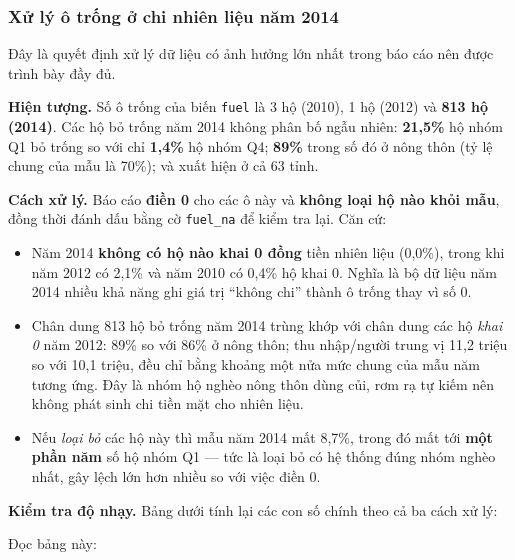 \documentclass[11pt,a4paper]{article}
\newcommand{\n}[1]{\textbf{#1}}
\newcommand{\tblfit}[1]{\resizebox{\linewidth}{!}{}}
\begin{document}
\subsubsection{Xử lý ô trống ở chi nhiên liệu năm 2014}\label{sec:fuel}

Đây là quyết định xử lý dữ liệu có ảnh hưởng lớn nhất trong báo cáo nên được trình bày đầy đủ.

\textbf{Hiện tượng.} Số ô trống của biến \texttt{fuel} là 3 hộ (2010), 1 hộ (2012) và \n{813 hộ (2014)}. Các hộ bỏ trống năm 2014 không phân bố ngẫu nhiên: \n{21,5\%} hộ nhóm Q1 bỏ trống so với chỉ \n{1,4\%} hộ nhóm Q4; \n{89\%} trong số đó ở nông thôn (tỷ lệ chung của mẫu là 70\%); và xuất hiện ở cả 63 tỉnh.

\textbf{Cách xử lý.} Báo cáo \n{điền 0} cho các ô này và \n{không loại hộ nào khỏi mẫu}, đồng thời đánh dấu bằng cờ \texttt{fuel\_na} để kiểm tra lại. Căn cứ:

\begin{itemize}[leftmargin=1.2em,itemsep=2pt,topsep=2pt]
\item Năm 2014 \n{không có hộ nào khai 0 đồng} tiền nhiên liệu (0,0\%), trong khi năm 2012 có 2,1\% và năm 2010 có 0,4\% hộ khai 0. Nghĩa là bộ dữ liệu năm 2014 nhiều khả năng ghi giá trị “không chi” thành ô trống thay vì số 0.
\item Chân dung 813 hộ bỏ trống năm 2014 trùng khớp với chân dung các hộ \emph{khai 0} năm 2012: 89\% so với 86\% ở nông thôn; thu nhập/người trung vị 11,2 triệu so với 10,1 triệu, đều chỉ bằng khoảng một nửa mức chung của mẫu năm tương ứng. Đây là nhóm hộ nghèo nông thôn dùng củi, rơm rạ tự kiếm nên không phát sinh chi tiền mặt cho nhiên liệu.
\item Nếu \emph{loại bỏ} các hộ này thì mẫu năm 2014 mất 8,7\%, trong đó mất tới \n{một phần năm} số hộ nhóm Q1 — tức là loại bỏ có hệ thống đúng nhóm nghèo nhất, gây lệch lớn hơn nhiều so với việc điền 0.
\end{itemize}

\textbf{Kiểm tra độ nhạy.} Bảng dưới tính lại các con số chính theo cả ba cách xử lý:

\begin{table}[H]\centering\small
\caption{Kết quả năm 2014 theo ba cách xử lý ô trống ở chi nhiên liệu}\label{tbl:fuel}
\tblfit{t_fuel}
\end{table}

Đọc bảng này:
\end{document}
